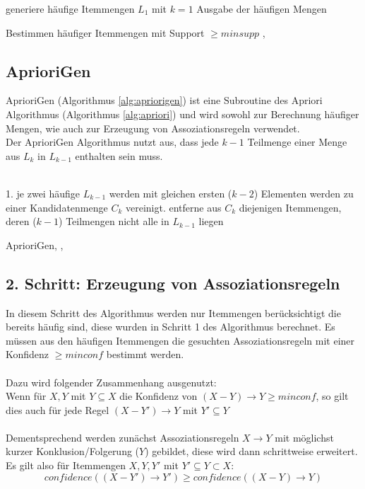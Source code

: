 \begin{algorithm}[H]
\label{alg:schritt1}
	generiere häufige Itemmengen $L_1$ mit $k=1$\;
	Ausgabe der häufigen Mengen\;	
\caption{Bestimmen häufiger Itemmengen mit Support $\geq minsupp$ \parencite[s.][S. 176]{TU_Dortmund}, \parencite[s.][2.1 Algorithm Apriori]{IBM}}
\end{algorithm}


\subsection{AprioriGen}
AprioriGen (Algorithmus \ref{alg:apriorigen}) ist eine Subroutine des Apriori Algorithmus (Algorithmus \ref{alg:apriori}) und wird sowohl zur Berechnung häufiger Mengen, wie auch zur Erzeugung von Assoziationsregeln verwendet.
\\
Der AprioriGen Algorithmus nutzt aus, dass jede $k-1$ Teilmenge einer Menge aus $L_k$ in $L_{k-1}$ enthalten sein muss. 
\\
\\
\begin{algorithm}[H]
\label{alg:apriorigen}
	1. je zwei häufige $L_{k-1}$ werden mit gleichen ersten ($k-2$) Elementen werden zu einer Kandidatenmenge $C_k$ vereinigt. entferne aus $C_k$ diejenigen Itemmengen, deren ($k-1$) Teilmengen nicht alle in $L_{k-1}$ liegen\;
\caption{AprioriGen, \parencite[s.][2.1.1 Apriori Candidate Generation
]{IBM}, \parencite[s.][S. 177f]{TU_Dortmund}}
\end{algorithm}
\newpage
\subsection{2. Schritt: Erzeugung von Assoziationsregeln}
In diesem Schritt des Algorithmus werden nur Itemmengen berücksichtigt die bereits häufig sind, diese wurden in Schritt 1 des Algorithmus berechnet. Es müssen aus den häufigen Itemmengen die gesuchten Assoziationsregeln mit einer Konfidenz $\geq minconf$ bestimmt werden.\\
\\
Dazu wird folgender Zusammenhang ausgenutzt: \\
Wenn für $X,Y$ mit $Y \subseteq X$ die Konfidenz von $(X-Y) \rightarrow Y \geq minconf$, so gilt dies auch für jede Regel $(X-Y') \rightarrow Y$ mit $Y' \subseteq Y$
\\ 
\\
Dementsprechend werden zunächst Assoziationsregeln $X \rightarrow Y $ mit möglichst kurzer Konklusion/Folgerung ($Y$) gebildet, diese wird dann schrittweise erweitert. Es gilt also für Itemmengen $X, Y, Y'$ mit $Y' \subseteq Y \subset X$:
\begin{equation}
	confidence((X-Y') \rightarrow Y') \geq confidence((X - Y) \rightarrow Y)
\end{equation}



